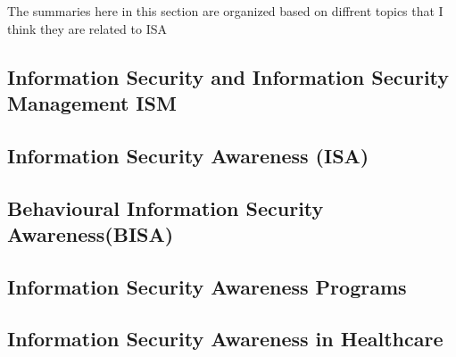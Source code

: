 The summaries here in this section are organized based on diffrent topics that I think they are related to ISA

\subsection{Information Security and Information Security Management ISM}
\label{c:literatur:summaries:Information Security}


\subsection{Information Security Awareness (ISA)}
\label{c:literatur:summaries:info-sec-awa}


\subsection{Behavioural Information Security Awareness(BISA)}
\label{c:literatur:summaries:behav-info-sec-awa}


\subsection{Information Security Awareness Programs }
\label{c:literatur:summaries:info-sec-awa-prog}


\subsection{Information Security Awareness in Healthcare}
\label{c:literatur:summaries:info-sec-awa-helth}

%